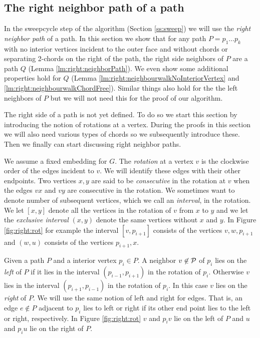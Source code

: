
\subsection{The right neighbor path of a path}
\thispagestyle{plain}
  \label{ss:rightNeighbour}
  In the sweepcycle step of the algorithm (Section \ref{ss:sweep}) we will use the \emph{right neighbor path} of a path. In this section we show that for any path $P = p_1 \ldots p_k$ with no interior vertices incident to the outer face and without chords or separating 2-chords on the right of the path, the right side neighbors of $P$ are a path $Q$ (Lemma \ref{lm:right:neighborPath}).
  We even show some additional properties hold for $Q$ (Lemma  \ref{lm:right:neighbourwalkNoInteriorVertex} and \ref{lm:right:neighbourwalkChordFree}).
  Similar things also hold for the the left neighbors of $P$ but we will not need this for the proof of our algorithm.

  The right side of a path is not yet defined. To do so we start this section by introducing the notion of rotations at a vertex. During the proofs in this section we will also need various types of chords so we subsequently introduce these. Then we finally can start discussing right neighbor paths.

    We assume a fixed embedding for $G$. The \emph{rotation} at a vertex $v$ is the clockwise order of the edges incident to $v$. We will identify these edges with their other endpoints.
    Two vertices $x, y$ are said to be \emph{consecutive} in the rotation at $v$ when the edges $vx$ and $vy$ are consecutive in the rotation.
    We sometimes want to denote number of subsequent vertices, which we call an \emph{interval}, in the rotation. We let $[x,y]$ denote all the vertices in the rotation of $v$ from $x$ to $y$ and we let the \emph{exclusive interval} $(x,y)$ denote the same vertices without $x$ and $y$. In Figure \ref{fig:right:rot} for example the interval $[v,p_{i+1}]$ consists of the vertices $v,w,p_{i+1}$ and $(w,u)$ consists of the vertices $p_{i+1}, x$.

    Given a path $P$ and a interior vertex $p_i \in P$. A neighbor $v \not \in \mathcal{P}$ of $p_i$ lies on the \emph{left} of $P$ if it lies in the interval $(p_{i-1}, p_{i+1})$ in the rotation of $p_{i}$. Otherwise $v$ lies in the interval $(p_{i+1}, p_{i-1})$ in the rotation of $p_i$. In this case $v$ lies on the \emph{right} of $P$.
    We will use the same notion of left and right for edges. That is, an edge $e\nin P$ adjacent to $p_i$ lies to left or right if its other end point lies to the left or right, respectively. In Figure \ref{fig:right:rot} $v$ and $p_i v$ lie on the left of $P$ and $u$ and $p_i u$ lie on the right of $P$.

